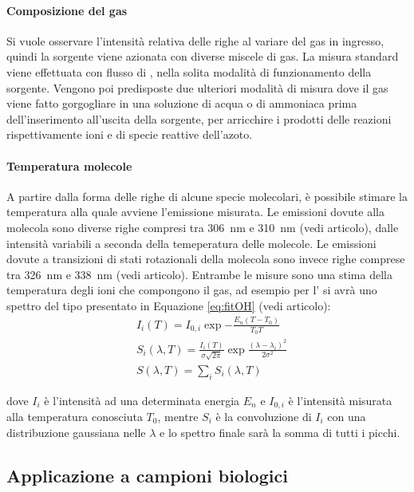 \paragraph{Composizione del gas}Si vuole osservare l'intensità relativa delle righe al variare del gas in ingresso, quindi la sorgente viene azionata con diverse miscele di gas. La misura standard viene effettuata con flusso di , nella solita modalità di funzionamento della sorgente. Vengono poi predisposte due ulteriori modalità di misura dove il gas viene fatto gorgogliare in una soluzione di acqua o di ammoniaca prima dell'inserimento all'uscita della sorgente, per arricchire i prodotti delle reazioni rispettivamente ioni  e di specie reattive dell'azoto.

\paragraph{Temperatura molecole} A partire dalla forma delle righe di alcune specie molecolari, è possibile stimare la temperatura alla quale avviene l'emissione misurata. Le emissioni dovute alla molecola  sono diverse righe compresi tra \SI{306}{\nano\meter} e \SI{310}{\nano\meter} (vedi articolo), dalle intensità variabili a seconda della temeperatura delle molecole. Le emissioni dovute a transizioni di stati rotazionali della molecola  sono invece righe comprese tra \SI{326}{\nano\meter} e \SI{338}{\nano\meter} (vedi articolo). Entrambe le misure sono una stima della temperatura degli ioni che compongono il gas, ad esempio per l' si avrà uno spettro del tipo presentato in Equazione \ref{eq:fitOH} (vedi articolo):
\begin{equation}
\begin{split}
&I_i (T) = I_{0,i} \exp{-\frac{E_n (T-T_0)}{T_0 T}} \\
&S_i(\lambda,T) = \frac{I_i(T)}{\sigma \sqrt{2\pi}} \exp{\frac{(\lambda - \lambda_i)^2}{2\sigma^2}}\\
&S(\lambda,T) = \sum_i S_i(\lambda,T)
\end{split}
\label{eq:fitOH}
\end{equation}

dove $I_i$ è l'intensità ad una determinata energia $E_n$ e $I_{0,i}$ è l'intensità misurata alla temperatura conosciuta $T_0$, mentre $S_i$ è la convoluzione di $I_i$ con una distribuzione gaussiana nelle $\lambda$ e lo spettro finale sarà la somma di tutti i picchi.

\subsection{Applicazione a campioni biologici}


\label{ch:sorgentemisure}
